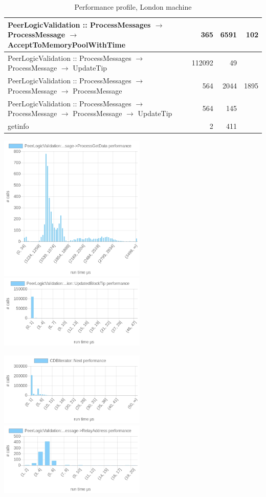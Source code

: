 \documentclass{article}
\begin{document}
\begin{table}
\begin{longtable}{P{8cm}|r|r|r}
	PeerLogicValidation :: ProcessMessages $\to$ ProcessMessage $\to$ AcceptToMemoryPoolWithTime& 365& 6591&102\\\hline
	PeerLogicValidation :: ProcessMessages $\to$ ProcessMessage $\to$ UpdateTip& 112092& 49&\\\hline
	PeerLogicValidation :: ProcessMessages $\to$ ProcessMessage $\to$ ProcessMessage& 564& 2044&1895\\\hline
	PeerLogicValidation :: ProcessMessages $\to$ ProcessMessage $\to$ ProcessMessage $\to$ UpdateTip& 564& 145&\\\hline
	getinfo& 2& 411&\\\hline
\end{longtable}

\caption{\label{tableProfilingLondon} Performance profile, London machine}
\end{table}

\includegraphics[width=7cm]{images/london/chartPeerLogicValidation_3A_3AProcessMessages-_3EProcessMessage-_3EProcessGetData.png}
\includegraphics[width=7cm]{images/london/chartPeerLogicValidation_3A_3AProcessMessages-_3EProcessMessage-_3EPeerLogicValidation_3A_3AUpdatedBlockTip.png}

\includegraphics[width=7cm]{images/london/chartCDBIterator_3A_3ANext.png}
\includegraphics[width=7cm]{images/london/chartPeerLogicValidation_3A_3AProcessMessages-_3EProcessMessage-_3ERelayAddress.png}
\end{document}
